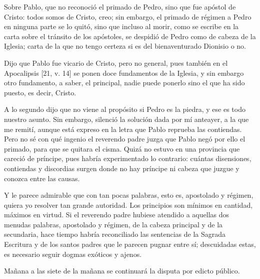 Sobre Pablo, que no reconoció el primado de Pedro, sino que fue apóstol de Cristo: todos somos de Cristo, creo; sin embargo, el primado de régimen a Pedro en ninguna parte se lo quitó, sino que incluso al morir, como se escribe en la carta sobre el tránsito de los apóstoles, se despidió de Pedro como de cabeza de la Iglesia; carta de la que no tengo certeza si es del bienaventurado Dionisio o no.

Dijo que Pablo fue vicario de Cristo, pero no general, pues también en el Apocalipsis [21, v. 14] se ponen doce fundamentos de la Iglesia, y sin embargo otro fundamento, a saber, el principal, nadie puede ponerlo sino el que ha sido puesto, es decir, Cristo.

A lo segundo dijo que no viene al propósito si Pedro es la piedra, y ese es todo nuestro asunto. Sin embargo, silenció la solución dada por mí anteayer, a la que me remití, aunque está expreso en la letra que Pablo reprueba las contiendas. Pero no sé con qué ingenio el reverendo padre juzga que Pablo negó por ello el primado, para que se quitara el cisma. Quizá no estuvo en una provincia que careció de príncipe, pues habría experimentado lo contrario: cuántas disensiones, contiendas y discordias surgen donde no hay príncipe ni cabeza que juzgue y conozca entre las causas.

Y le parece admirable que con tan pocas palabras, esto es, apostolado y régimen, quiera yo resolver tan grande autoridad. Los principios son mínimos en cantidad, máximos en virtud. Si el reverendo padre hubiese atendido a aquellas dos menudas palabras, apostolado y régimen, de la cabeza principal y de la secundaria, hace tiempo habría reconciliado las sentencias de la Sagrada Escritura y de los santos padres que le parecen pugnar entre sí; descuidadas estas, es necesario seguir dogmas exóticos y ajenos.

Mañana a las siete de la mañana se continuará la disputa por edicto público.

